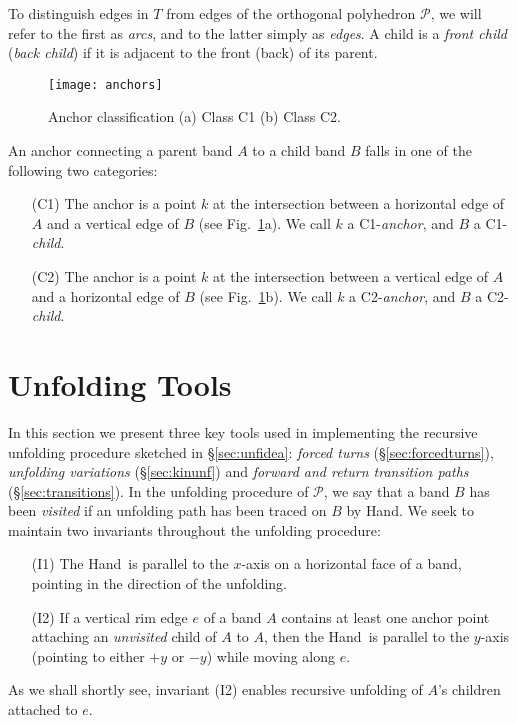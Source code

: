\documentclass[11pt]{article}
\def\P{{\mathcal P}}
\newcommand\hand{{\sc Hand}}
\begin{document}
To distinguish edges in $T$ from edges of the orthogonal polyhedron $\P$, we will refer to
the first as \emph{arcs}, and to the latter simply as \emph{edges}. A child is a \emph{front child} (\emph{back child}) if it is adjacent to the front (back) of its parent.

\begin{figure}[htbp]
\centering
\texttt{[image: anchors]}
\caption{Anchor classification (a) Class C1 (b) Class C2.}
\label{fig:anchors}
\end{figure}


\noindent
An anchor connecting a parent band $A$ to a child band $B$ falls in one of the following two categories:
\begin{itemize}
\item [(C1)] The anchor is a point $k$ at the intersection between a horizontal edge of $A$ and a vertical edge of $B$ 
(see Fig.~\ref{fig:anchors}a). We call $k$ a C1-\emph{anchor}, and $B$ a C1-\emph{child}. 
\item [(C2)] The anchor is a point $k$ at the intersection between a vertical edge of $A$ and a horizontal edge of $B$
(see Fig.~\ref{fig:anchors}b). We call $k$ a C2-\emph{anchor}, and $B$ a C2-\emph{child}. 
\end{itemize}

\section{Unfolding Tools}
In this section we present three key tools used in implementing the recursive unfolding procedure sketched in \S\ref{sec:unfidea}: \emph{forced turns} (\S\ref{sec:forcedturns}), \emph{unfolding variations} (\S\ref{sec:kinunf}) and \emph{forward and return transition paths} (\S\ref{sec:transitions}).
In the unfolding procedure of $\P$, we say that a band $B$ has been \emph{visited} if an unfolding path has been traced on $B$ by \hand. We seek to maintain two invariants throughout the unfolding procedure:
\begin{enumerate}
\item [(I1)] The \hand\ is parallel to the $x$-axis on a horizontal face of a band, pointing in the direction of the unfolding.
\item [(I2)] If a vertical rim edge $e$ of a band $A$ contains at least one anchor point attaching an \emph{unvisited} child of $A$ to $A$, then the \hand\ is parallel to the $y$-axis (pointing to either $+y$ or $-y$) while moving along $e$.
\end{enumerate}
As we shall shortly see, invariant (I2) enables recursive unfolding of $A$'s children attached to $e$.
\end{document}
